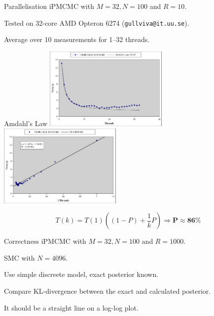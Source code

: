\documentclass[usenames,dvipsnames,10pt]{beamer}
\begin{document}
\begin{frame}[fragile]{Parallelisation}
    iPMCMC with $M = 32, N = 100$ and $R = 10$.    

    Tested on 32-core AMD Opteron 6274 (\texttt{gullviva@it.uu.se}).

    Average over 10 measurements for 1--32 threads.

\end{frame}

\begin{frame}[fragile]{Amdahl's Law}
    \includegraphics[width=0.45\textwidth]{parallel1.pdf}\hfill\includegraphics[width=0.45\textwidth]{parallel2.pdf}

    \[
        T(k) = T(1)\left((1-P) + \frac 1 k P\right) \Rightarrow \mathbf{ P \approx 86\%}
    \]
    
\end{frame}

\begin{frame}[fragile]{Correctness}
    iPMCMC with $M = 32, N = 100$ and $R = 1000$.    

    SMC with $N = 4096$.

    Use simple discreete model, exact posterior known.

    Compare KL-divergence between the exact and calculated posterior.

    It should be a straight line on a log-log plot.
\end{frame}
\end{document}
